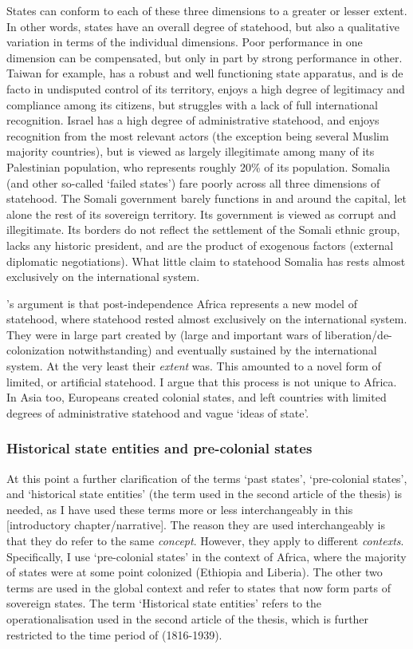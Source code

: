 States can conform to each of these three dimensions to a greater or lesser extent.
In other words, states have an overall degree of statehood, but also a
qualitative variation in terms of the individual dimensions. Poor performance in
one dimension can be compensated, but only in part by strong performance in other.
Taiwan for example, has a robust and well functioning state apparatus, and is de
facto in undisputed control of its territory, enjoys a high degree of legitimacy
and compliance among its citizens, but struggles with a lack of full
international recognition. Israel has a high degree of administrative statehood, and
enjoys recognition from the most relevant actors (the exception being several
Muslim majority countries), but is viewed as largely illegitimate among many of
its Palestinian population, who represents roughly 20\% of its population.
Somalia (and other so-called `failed states') fare poorly across all three
dimensions of statehood. The Somali government barely functions in and around the
capital, let alone the rest of its sovereign territory. Its government is
viewed as corrupt and illegitimate. Its borders do not reflect the settlement of
the Somali ethnic group, lacks any historic president, and are the product of
exogenous factors (external diplomatic negotiations). What little claim to
statehood Somalia has rests almost exclusively on the international system.

\citet{Clapham1996}'s argument is that post-independence Africa represents a new
model of statehood, where statehood rested almost exclusively on the
international system. They were in large part created by (large and important
wars of liberation/de-colonization notwithstanding) and eventually sustained by
the international system. At the very least their \textit{extent} was. This
amounted to a novel form of limited, or artificial statehood. I argue that this
process is not unique to Africa. In Asia too, Europeans created colonial states,
and left countries with limited degrees of administrative statehood and vague
`ideas of state'.

\subsubsection{Historical state entities and pre-colonial states} 
\label{Historical state entities and Pre-colonial states}

At this point a further clarification of the terms `past states', `pre-colonial
states', and `historical state entities' (the term used in the second article of
the thesis) is needed, as I have used these terms more or less interchangeably
in this [introductory chapter/narrative]. The reason they are used
interchangeably is that they do refer to the same \textit{concept}. However,
they apply to different \textit{contexts}. Specifically, I use `pre-colonial
states' in the context of Africa, where the majority of states were at some
point colonized (Ethiopia and Liberia). The other two terms are used in the
global context and refer to states that now form parts of sovereign states. The
term `Historical state entities' refers to the operationalisation used in the
second article of the thesis, which is further restricted to the time period of
(1816-1939).

